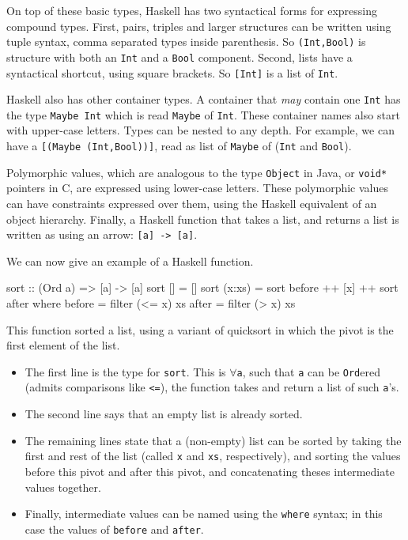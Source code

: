\documentclass[11pt]{article}
\begin{document}
On top of these basic types, Haskell has two syntactical forms for expressing
compound types.
First, pairs, triples and larger structures can be written using tuple syntax,
comma separated types inside parenthesis.
So \verb|(Int,Bool)| is structure with both an \verb|Int| and a \verb|Bool| component.
Second, lists have a syntactical shortcut, using square brackets.
So \verb|[Int]| is a list of \verb|Int|.

Haskell also has other container types. A container
that {\em may\/} contain one \verb|Int| has the type
\verb|Maybe Int|
which is read \verb|Maybe| of \verb|Int|.
These container names also start with upper-case letters.
Types can be nested to any depth. For example, we can have a \verb|[(Maybe (Int,Bool))]|,
read as list of \verb|Maybe| of (\verb|Int| and \verb|Bool|).

Polymorphic values, which are analogous to the type \verb|Object| in Java,
or \verb|void*| pointers in C, are expressed using lower-case letters.
These polymorphic values can have constraints expressed over them,
using the Haskell equivalent of an object hierarchy.
Finally, a Haskell function that takes a list, and returns a list
is written as using an arrow: \verb|[a] -> [a]|.

We can now give an example of a Haskell function.%
\begin{Code}

sort :: (Ord a) => [a] -> [a]
sort []     = []
sort (x:xs) = sort before ++ [x] ++ sort after
  where
        before = filter (<= x) xs
        after  = filter (> x) xs

\end{Code}
This function sorted a list, using a variant of quicksort in which the pivot is
the first element of the list.
\begin{itemize}
\item The first line is the type for \verb|sort|. This is $\forall$\verb|a|, such that
\verb|a| can be \verb|Ord|ered (admits comparisons like \verb|<=|), the function
takes and return a list of such \verb|a|'s.
\item The second line says that an empty list is already sorted.
\item The remaining lines state that a (non-empty) list can be
sorted by taking the first and rest of the list (called \verb|x| and \verb|xs|, respectively),
and sorting the values before this pivot and after this pivot,
and concatenating theses intermediate values together.
\item Finally, intermediate values can be named using the \verb|where| syntax;
in this case the values of \verb|before| and \verb|after|.
\end{itemize}
\end{document}
